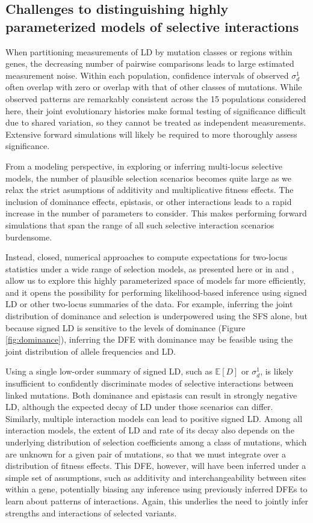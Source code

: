 \documentclass[]{article}
\newcommand{\E}{\mathbb{E}}
\begin{document}
\subsection{Challenges to distinguishing highly parameterized models of selective interactions}

When partitioning measurements of LD by mutation classes or regions within
genes, the decreasing number of pairwise comparisons leads to large estimated
measurement noise. Within each population, confidence intervals of observed
\(\sigma_d^1\) often overlap with zero or overlap with that of other classes of
mutations. While observed patterns are remarkably consistent across the 15
populations considered here, their joint evolutionary histories make formal
testing of significance difficult due to shared variation, so they cannot be
treated as independent measurements. Extensive forward simulations will likely
be required to more thoroughly assess significance.

From a modeling perspective, in exploring or inferring multi-locus selective
models, the number of plausible selection scenarios becomes quite large as we
relax the strict asumptions of additivity and multiplicative fitness effects.
The inclusion of dominance effects, epistasis, or other interactions leads to a
rapid increase in the number of parameters to consider. This makes performing
forward simulations that span the range of all such selective interaction
scenarios burdensome.

Instead, closed, numerical approaches to compute expectations for two-locus
statistics under a wide range of selection models, as presented here or in
\citet{Ragsdale2019-nt} and \citet{Friedlander2022-bs}, allow us to explore
this highly parameterized space of models far more efficiently, and it opens
the possibility for performing likelihood-based inference using signed LD or
other two-locus summaries of the data. For example, inferring the joint
distribution of dominance and selection is underpowered using the SFS alone,
but because signed LD is sensitive to the levels of dominance (Figure
\ref{fig:dominance}), inferring the DFE with dominance may be feasible using
the joint distribution of allele frequencies and LD.

Using a single low-order summary of signed LD, such as \(\E[D]\) or
\(\sigma_d^1\), is likely insufficient to confidently discriminate modes of
selective interactions between linked mutations. Both dominance and epistasis
can result in strongly negative LD, although the expected decay of LD under
those scenarios can differ. Similarly, multiple interaction models can lead to
positive signed LD. Among all interaction models, the extent of LD and rate of
its decay also depends on the underlying distribution of selection coefficients
among a class of mutations, which are unknown for a given pair of mutations, so
that we must integrate over a distribution of fitness effects. This DFE,
however, will have been inferred under a simple set of assumptions, such as
additivity and interchangeability between sites within a gene, potentially
biasing any inference using previously inferred DFEs to learn about patterns of
interactions. Again, this underlies the need to jointly infer strengths and
interactions of selected variants.
\end{document}
